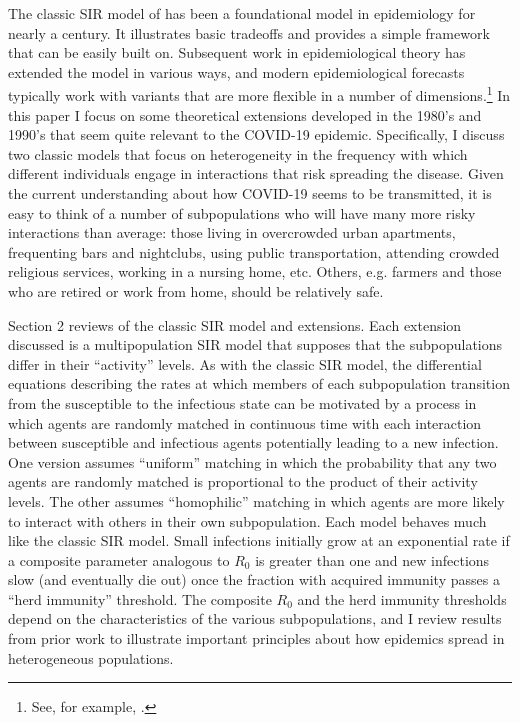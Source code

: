 \documentclass[11pt]{article}
\begin{document}
The classic SIR model of \citet{kermack1927contribution} has been a foundational model in epidemiology for
nearly a century. It illustrates basic tradeoffs and provides a simple framework that can be easily built on. Subsequent work 
in epidemiological theory has extended the model in various ways, and modern epidemiological forecasts typically work 
with variants that are more flexible in a number of dimensions.\footnote{See, for example, \citet{champredon2018two, viboud2018rapidd, unwin2020state}.} In this paper I focus on some theoretical extensions developed in the 1980's and 1990's that
seem quite relevant to the COVID-19 epidemic. Specifically, I discuss two classic models that
focus on heterogeneity in the frequency with which different individuals engage in interactions that risk spreading the
disease. Given the current understanding about how COVID-19 seems to be transmitted, it is easy to think of a 
number of subpopulations who will have many more risky interactions than average: those living in overcrowded urban apartments, frequenting bars and nightclubs, using public transportation, attending crowded religious services, working in a nursing home, etc. Others, e.g. farmers and those who are retired
or work from home, should be relatively safe. 

Section 2 reviews of the classic SIR model and extensions. Each extension discussed is a multipopulation
SIR model that supposes that the subpopulations differ in their ``activity'' levels. As with the classic SIR model, the 
differential equations describing the rates at which members of each subpopulation transition from the susceptible
to the infectious state can be motivated by a process in which agents are randomly matched in continuous
time with each interaction between susceptible and infectious agents potentially leading to a new infection. One 
version assumes ``uniform'' matching in which the probability that any two agents are randomly matched is
proportional to the product of their activity levels. The other assumes ``homophilic'' matching in which agents are more likely to interact with others in their own subpopulation. Each model behaves much like the classic
SIR model. Small infections initially grow at an exponential rate if a composite parameter analogous to $R_0$ is greater 
than  one and new infections slow (and eventually die out) once the fraction with acquired immunity passes a ``herd 
immunity'' threshold. The composite $R_0$ and the herd immunity thresholds depend on the characteristics
of the various subpopulations, and I review results from prior work to illustrate important principles about how epidemics spread in heterogeneous populations.
\end{document}
